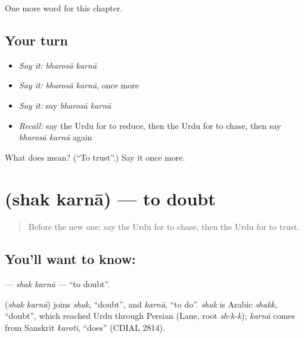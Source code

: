 \begin{grammarlens}[title={What you've built}]
One more word for this chapter.
\end{grammarlens}

\subsection*{Your turn}
\begin{itemize}
\raggedright
  \item \emph{Say it:} \emph{bharosā karnā}
  \item \emph{Say it:} \emph{bharosā karnā}, once more
  \item \emph{Say it:} say \emph{bharosā karnā}
  \item \emph{Recall:} say the Urdu for to reduce, then the Urdu for to chase, then say \emph{bharosā karnā} again
\end{itemize}

\begin{tcolorbox}[breakable,colback=teal!4,colframe=teal!35!black,title={Before you move on}]
What does   mean? (\textquotedblleft{}To trust\textquotedblright{}.) Say it once more.
\end{tcolorbox}
\section[\texorpdfstring{\ur{شک} \ur{کرنا} (shak karnā)}{شک کرنا (shak karnā)}]{  (shak karnā) — to doubt}

\label{lesson:UR-C215-shak-karna}



\begin{quote}
Before the new one: say the Urdu for to chase, then the Urdu for to trust.
\end{quote}

\subsection*{You'll want to know:  }
\textbf{ } — \emph{shak karnā} — \textquotedblleft{}to doubt\textquotedblright{}.

\begin{cousinweb}
\textbf{ } (\emph{shak karnā}) joins \emph{shak}, \textquotedblleft{}doubt\textquotedblright{}, and \emph{karnā}, \textquotedblleft{}to do\textquotedblright{}. \emph{shak} is Arabic \emph{shakk}, \textquotedblleft{}doubt\textquotedblright{}, which reached Urdu through Persian (Lane, root \emph{sh-k-k}); \emph{karnā} comes from Sanskrit \emph{karoti}, \textquotedblleft{}does\textquotedblright{} (CDIAL 2814).
\end{cousinweb}

